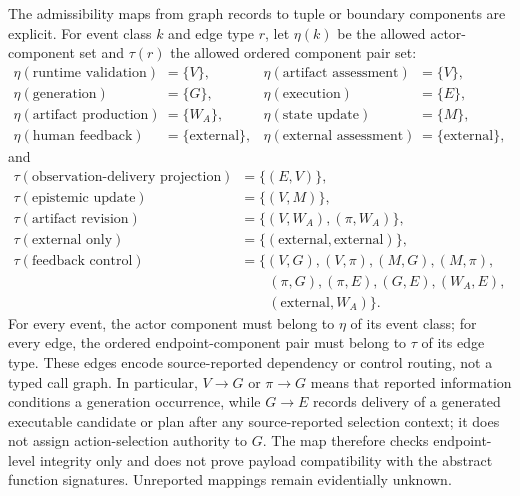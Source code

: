 \documentclass{article}
\begin{document}
The admissibility maps from graph records to tuple or boundary components are explicit. For event class $k$ and edge type $r$, let $\eta(k)$ be the allowed actor-component set and $\tau(r)$ the allowed ordered component pair set:
{\footnotesize
\vspace{6pt}
\begin{align}
\eta(\text{runtime validation})&=\{V\}, & \eta(\text{artifact assessment})&=\{V\}, \nonumber\\
\eta(\text{generation})&=\{G\}, & \eta(\text{execution})&=\{E\}, \nonumber\\
\eta(\text{artifact production})&=\{W_A\}, & \eta(\text{state update})&=\{M\}, \nonumber\\
\eta(\text{human feedback})&=\{\mathrm{external}\}, &
\eta(\text{external assessment})&=\{\mathrm{external}\},
\label{eq:event-component-map}
\end{align}
and
\begin{align}
\tau(\text{observation-delivery projection})&=\{(E,V)\}, \nonumber\\
\tau(\text{epistemic update})&=\{(V,M)\}, \nonumber\\
\tau(\text{artifact revision})&=\{(V,W_A),(\pi,W_A)\}, \nonumber\\
\tau(\text{external only})&=\{(\mathrm{external},\mathrm{external})\}, \nonumber\\
\tau(\text{feedback control})&=\{(V,G),(V,\pi),(M,G),(M,\pi),\nonumber\\
&\qquad (\pi,G),(\pi,E),(G,E),(W_A,E),\nonumber\\
&\qquad (\mathrm{external},W_A)\}.
\label{eq:edge-component-map}
\end{align}
\vspace{6pt}
}
For every event, the actor component must belong to $\eta$ of its event class; for every edge, the ordered endpoint-component pair must belong to $\tau$ of its edge type. These edges encode source-reported dependency or control routing, not a typed call graph. In particular, $V\!\rightarrow\!G$ or $\pi\!\rightarrow\!G$ means that reported information conditions a generation occurrence, while $G\!\rightarrow\!E$ records delivery of a generated executable candidate or plan after any source-reported selection context; it does not assign action-selection authority to $G$. The map therefore checks endpoint-level integrity only and does not prove payload compatibility with the abstract function signatures. Unreported mappings remain evidentially unknown.
\end{document}
